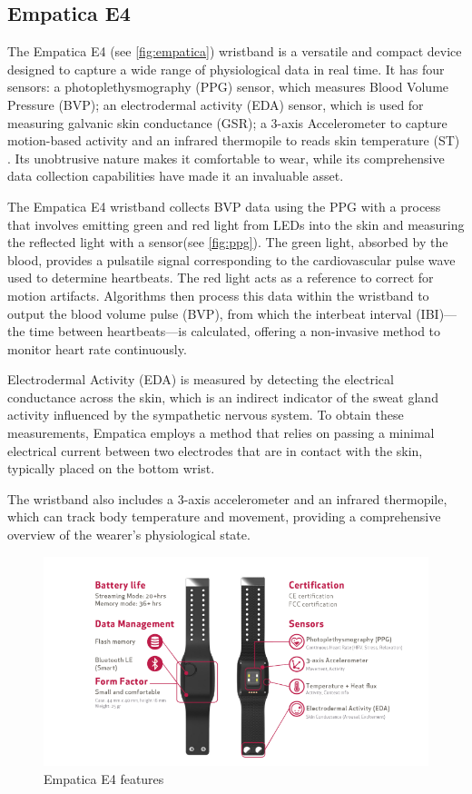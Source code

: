 \subsection*{Empatica E4}
The Empatica E4 (see \autoref*{fig:empatica}) wristband is a versatile and compact device designed to capture a wide range of physiological data in real time. 
It has four sensors: a photoplethysmography (PPG) sensor, which measures Blood Volume Pressure (BVP); an electrodermal activity (EDA) sensor, which is used for measuring galvanic skin conductance (GSR); a 3-axis Accelerometer to capture motion-based activity and an infrared thermopile to reads skin temperature (ST) \parencite{empa}. Its unobtrusive nature makes it comfortable to wear, while its comprehensive data collection capabilities have made it an invaluable asset.

The Empatica E4 wristband collects \gls{BVP} data using the \gls{PPG} with a process that involves emitting green and red light from LEDs into the skin and measuring the reflected light with a sensor(see \autoref{fig:ppg}). The green light, absorbed by the blood, provides a pulsatile signal corresponding to the cardiovascular pulse wave used to determine heartbeats. The red light acts as a reference to correct for motion artifacts. Algorithms then process this data within the wristband to output the blood volume pulse (BVP), from which the interbeat interval (IBI)—the time between heartbeats—is calculated, offering a non-invasive method to monitor heart rate continuously.\parencite{emp2}

Electrodermal Activity (EDA) is measured by detecting the electrical conductance across the skin, which is an indirect indicator of the sweat gland activity influenced by the sympathetic nervous system. To obtain these measurements, Empatica employs a method that relies on passing a minimal electrical current between two electrodes that are in contact with the skin, typically placed on the bottom wrist.

The wristband also includes a 3-axis accelerometer and an infrared thermopile, which can track body temperature and movement, providing a comprehensive overview of the wearer's physiological state.



\begin{figure}[hb]
	\centering
	\includegraphics[width=\columnwidth]{images/Empatica.png}
	\caption{Empatica E4 features \parencite{emp}}
	\label{fig:empatica}
\end{figure}



